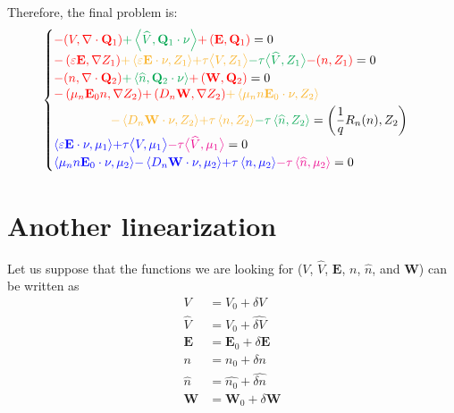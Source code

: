 \documentclass[a4paper,12pt]{article}
\newcommand{\diver}[1]{\ensuremath{\nabla \cdot #1}}
\begin{document}
Therefore, the final problem is:
\[
 \begin{cases}
  {\color{red} -(V, \diver{\mathbf{Q}_{1}})}
      {\color{Green} + \left<\widehat{V}, \mathbf{Q}_{1} \cdot \nu \right>}
      {\color{red} + \left(\mathbf{E}, \mathbf{Q}_{1} \right)} = 0 \\
  {\color{red} - \left(\varepsilon \mathbf{E}, \nabla Z_{1}\right)}
      {\color{Dandelion} + \left<\varepsilon \mathbf{E} \cdot \nu, Z_{1}\right>}
      {\color{Dandelion} + \tau \big< V , Z_{1} \big> }
      {\color{Green} - \tau \big< \widehat{V}, Z_{1} \big>}
      {\color{red} - (n,Z_{1})} = 0 \\
  {\color{red} -(n, \diver{\mathbf{Q}_{2}})}
      {\color{Green} + \left<\widehat{n}, \mathbf{Q}_{2} \cdot \nu \right>}
      {\color{red} + \left(\mathbf{W}, \mathbf{Q}_{2} \right)} = 0 \\
  \begin{aligned}
      {\color{red} - \left(\mu_n \mathbf{E}_{0} n, \nabla Z_{2} \right)}
          {\color{red} + \left( D_n \mathbf{W}, \nabla Z_{2} \right)}
          {\color{Dandelion} + \left<\mu_n n \mathbf{E}_{0} \cdot \nu, Z_{2} \right>}
          \hphantom{- \left< D_n \mathbf{W} \cdot \nu, Z_{2} \right> } \\
      {\color{Dandelion} - \left< D_n \mathbf{W} \cdot \nu, Z_{2} \right>}
          {\color{Dandelion} + \tau \left<n, Z_{2}\right> } 
          {\color{Green} - \tau \left<\widehat{n}, Z_{2}\right>} = 
          {\left(\frac{1}{q}R_n(n), Z_2\right)}
  \end{aligned} \\
  {\color{blue} \left<\varepsilon \mathbf{E} \cdot \nu, \mu_{1}\right>}
      {\color{blue} + \tau \big< V, \mu_{1}\big>}
      {\color{Magenta} - \tau \big<\widehat{V}, \mu_{1} \big>} = 0 \\
  {\color{blue} \left<\mu_n n \mathbf{E}_{0} \cdot \nu, \mu_{2} \right>}
      {\color{blue} -\left<D_n \mathbf{W} \cdot \nu, \mu_{2} \right>}
      {\color{blue} + \tau \left< n, \mu_{2} \right>}
      {\color{Magenta} - \tau \left<\widehat{n}, \mu_{2} \right>} = 0
 \end{cases}
\]

\section{Another linearization}
Let us suppose that the functions we are looking for ($V$, $\widehat{V}$, $\mathbf{E}$, $n$, 
$\widehat{n}$, and $\mathbf{W}$) can be written as
\[
 \begin{split}
    V           & = V_{0} + \delta V \\
    \widehat{V} & = \widehat{V_{0}} + \widehat{\delta V} \\
    \mathbf{E}  & = \mathbf{E}_{0} + \delta \mathbf{E} \\
    n           & = n_{0} + \delta n \\
    \widehat{n} & = \widehat{n_{0}} + \widehat{\delta n} \\
    \mathbf{W}  & = \mathbf{W}_{0} + \delta \mathbf{W}
 \end{split}
\]
\end{document}
